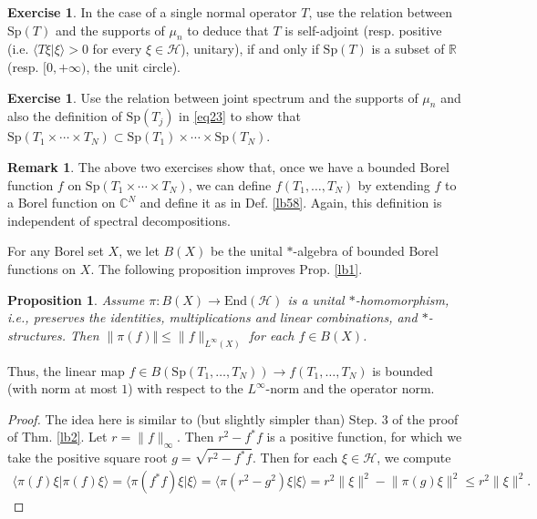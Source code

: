 \documentclass[12pt,a4paper,notitlepage]{article}
\theoremstyle{definition}
\newtheorem{exe}[df]{Exercise}
\newtheorem{rem}[df]{Remark}
\theoremstyle{plain}
\newtheorem{pp}[df]{Proposition}
\newcommand{\mc}{\mathcal}
\newcommand{\End}{\mathrm{End}} %
\newcommand{\bk}[1]{\langle {#1}\rangle}
\newcommand{\Cbb}{\mathbb C}
\newcommand{\Rbb}{\mathbb R}
\newcommand{\Sp}{\mathrm{Sp}}
\numberwithin{equation}{section}
\begin{document}
\begin{exe}
In the case of a single normal operator $T$, use the relation between $\Sp(T)$ and the supports of $\mu_n$ to deduce  that  $T$ is self-adjoint (resp. positive (i.e. $\bk{T\xi|\xi}>0$ for every $\xi\in\mc H$), unitary), if and only if $\Sp(T)$ is a subset of $\Rbb$ (resp. $[0,+\infty)$, the unit circle).
\end{exe}

\begin{exe}
Use the relation between joint spectrum and the supports of $\mu_n$ and also the definition of $\Sp(T_j)$ in \eqref{eq23} to show that  $\Sp(T_1\times\cdots\times T_N)\subset\Sp(T_1)\times\cdots\times\Sp(T_N)$.
\end{exe}

\begin{rem}\label{lb12}
The above two exercises show that, once we have a bounded Borel function $f$ on $\Sp(T_1\times\cdots\times T_N)$, we can define $f(T_1,\dots,T_N)$ by extending $f$ to a Borel function on $\Cbb^N$ and define it as in Def. \ref{lb58}. Again, this definition is independent of spectral decompositions.
\end{rem}


For any Borel set $X$, we let $B(X)$ be the unital $*$-algebra of bounded Borel functions on $X$. The following proposition improves Prop. \ref{lb1}.
\begin{pp}\label{lb46}
Assume $\pi:B(X)\rightarrow\End(\mc H)$ is a unital $*$-homomorphism, i.e., preserves the identities, multiplications and linear combinations, and $*$-structures. Then $\lVert \pi(f)\Vert\leq \lVert f\lVert_{L^\infty(X)}$ for each $f\in B(X)$. 
\end{pp}

Thus,  the linear map $f\in B(\Sp(T_1,\dots,T_N))\rightarrow f(T_1,\dots,T_N)$ is bounded (with norm at most $1$) with respect to the $L^\infty$-norm and the operator norm.

\begin{proof}
The idea here is similar to (but slightly simpler than) Step. 3 of the proof of Thm. \ref{lb2}.	Let $r=\lVert f\lVert_\infty$. Then $r^2-f^*f$ is a positive function, for which we take the positive square root $g=\sqrt{r^2-f^*f}$. Then for each $\xi\in\mc H$, we compute
	\begin{align*}
		\bk{\pi(f)\xi|\pi(f)\xi}=\bk{\pi(f^*f)\xi|\xi} =\bk{\pi(r^2-g^2)\xi|\xi}=r^2\lVert\xi\lVert^2-\lVert\pi(g)\xi\lVert^2\leq r^2\lVert\xi\lVert^2.
	\end{align*}
\end{proof}
\end{document}
